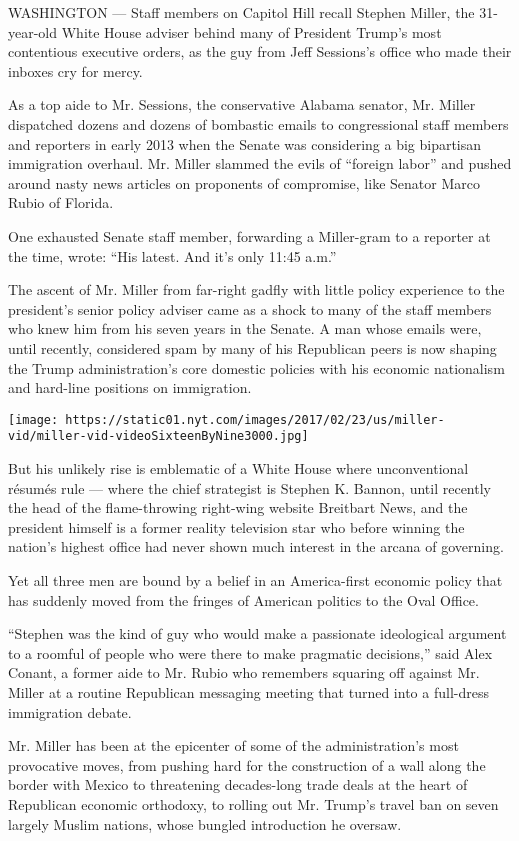 WASHINGTON --- Staff members on Capitol Hill recall Stephen Miller, the
31-year-old White House adviser behind many of President Trump's most
contentious executive orders, as the guy from Jeff Sessions's office who
made their inboxes cry for mercy.

As a top aide to Mr. Sessions, the conservative Alabama senator, Mr.
Miller dispatched dozens and dozens of bombastic emails to congressional
staff members and reporters in early 2013 when the Senate was
considering a big bipartisan immigration overhaul. Mr. Miller slammed
the evils of ``foreign labor'' and pushed around nasty news articles on
proponents of compromise, like Senator Marco Rubio of Florida.

One exhausted Senate staff member, forwarding a Miller-gram to a
reporter at the time, wrote: ``His latest. And it's only 11:45 a.m.''

The ascent of Mr. Miller from far-right gadfly with little policy
experience to the president's senior policy adviser came as a shock to
many of the staff members who knew him from his seven years in the
Senate. A man whose emails were, until recently, considered spam by many
of his Republican peers is now shaping the Trump administration's core
domestic policies with his economic nationalism and hard-line positions
on immigration.

\texttt{[image: https://static01.nyt.com/images/2017/02/23/us/miller-vid/miller-vid-videoSixteenByNine3000.jpg]}

But his unlikely rise is emblematic of a White House where
unconventional résumés rule --- where the chief strategist is Stephen K.
Bannon, until recently the head of the flame-throwing right-wing website
Breitbart News, and the president himself is a former reality television
star who before winning the nation's highest office had never shown much
interest in the arcana of governing.

Yet all three men are bound by a belief in an America-first economic
policy that has suddenly moved from the fringes of American politics to
the Oval Office.

``Stephen was the kind of guy who would make a passionate ideological
argument to a roomful of people who were there to make pragmatic
decisions,'' said Alex Conant, a former aide to Mr. Rubio who remembers
squaring off against Mr. Miller at a routine Republican messaging
meeting that turned into a full-dress immigration debate.

Mr. Miller has been at the epicenter of some of the administration's
most provocative moves, from pushing hard for the construction of a wall
along the border with Mexico to threatening decades-long trade deals at
the heart of Republican economic orthodoxy, to rolling out Mr. Trump's
travel ban on seven largely Muslim nations, whose bungled introduction
he oversaw.

